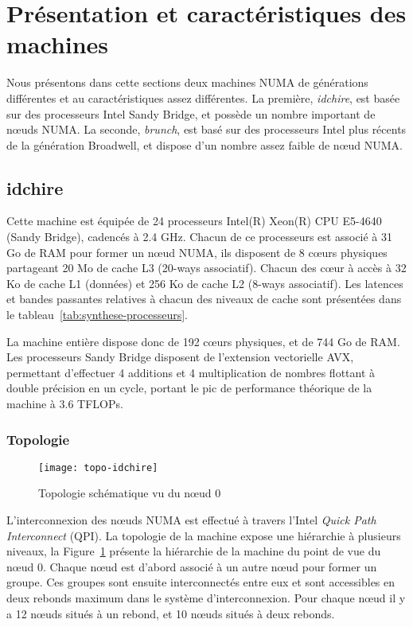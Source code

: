 \section{Présentation et caractéristiques des machines}\label{sec:contribs:machines}

Nous présentons dans cette sections deux machines NUMA de générations différentes et au caractéristiques assez différentes.
La première, \emph{idchire}, est basée sur des processeurs Intel Sandy Bridge, et possède un nombre important de nœuds NUMA.
La seconde, \emph{brunch}, est basé sur des processeurs Intel plus récents de la génération Broadwell, et dispose d'un nombre assez faible de nœud NUMA.

\subsection{idchire}\label{sec:contribs:machines:idchire}


Cette machine est équipée de 24 processeurs Intel(R) Xeon(R) CPU E5-4640 (Sandy Bridge), cadencés à 2.4 GHz.
Chacun de ce processeurs est associé à 31 Go de RAM pour former un nœud NUMA, ils disposent de 8 cœurs physiques partageant 20 Mo de cache L3 (20-ways associatif).
Chacun des cœur à accès à 32 Ko de cache L1 (données) et 256 Ko de cache L2 (8-ways associatif).
Les latences et bandes passantes relatives à chacun des niveaux de cache sont présentées dans le tableau~\ref{tab:synthese-processeurs}.

La machine entière dispose donc de 192 cœurs physiques, et de 744 Go de RAM.
Les processeurs Sandy Bridge disposent de l'extension vectorielle AVX, permettant d'effectuer 4 additions et 4 multiplication de nombres flottant à double précision en un cycle, portant le pic de performance théorique de la machine à 3.6 TFLOPs.

\subsubsection{Topologie}

\begin{figure}[ht]
  \centering
  \texttt{[image: topo-idchire]}
  \caption{Topologie schématique vu du nœud 0}\label{fig:contribs:machines:idchire:topo-liens}
\end{figure}

L'interconnexion des nœuds NUMA est effectué à travers l'Intel \emph{Quick Path Interconnect} (QPI).
La topologie de la machine expose une hiérarchie à plusieurs niveaux, la Figure~\ref{fig:contribs:machines:idchire:topo-liens} présente la hiérarchie de la machine du point de vue du nœud 0.
Chaque nœud est d'abord associé à un autre nœud pour former un groupe. Ces groupes sont ensuite interconnectés entre eux et sont accessibles en deux rebonds maximum dans le système d'interconnexion.
Pour chaque nœud il y a 12 nœuds situés à un rebond, et 10 nœuds situés à deux rebonds.

